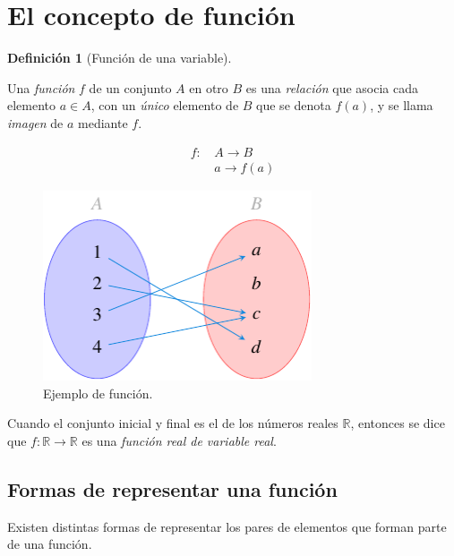 \documentclass[
  a4paper,
]{scrreport}
\theoremstyle{definition}
\theoremstyle{plain}
\theoremstyle{definition}
\newtheorem{definition}{Definición}[chapter]
\theoremstyle{definition}
\theoremstyle{plain}
\theoremstyle{plain}
\theoremstyle{remark}
\begin{document}
\section{El concepto de función}\label{el-concepto-de-funciuxf3n}

\begin{definition}[Función de una
variable]\protect\hypertarget{def-funcion-real}{}\label{def-funcion-real}

Una \emph{función} \(f\) de un conjunto \(A\) en otro \(B\) es una
\emph{relación} que asocia cada elemento \(a\in A\), con un \emph{único}
elemento de \(B\) que se denota \(f(a)\), y se llama \emph{imagen} de
\(a\) mediante \(f\).

\begin{align*}
f:\,&A\longrightarrow B\\
&a\longrightarrow f(a)
\end{align*}

\end{definition}

\begin{figure}[H]

{\centering \includegraphics[width=3.125in,height=\textheight]{./img/funciones/funcion.pdf}

}

\caption{Ejemplo de función.}

\end{figure}%

Cuando el conjunto inicial y final es el de los números reales
\(\mathbb{R}\), entonces se dice que
\(f:\mathbb{R}\rightarrow \mathbb{R}\) es una \emph{función real de
variable real}.

\subsection{Formas de representar una
función}\label{formas-de-representar-una-funciuxf3n}

Existen distintas formas de representar los pares de elementos que
forman parte de una función.
\end{document}
